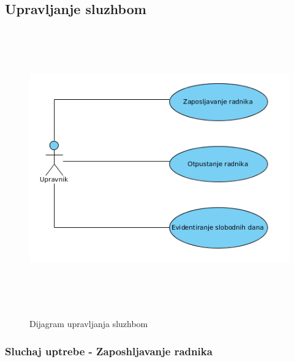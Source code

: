 \documentclass[10 pt]{article}
\begin{document}
	
	\subsection{Upravljanje sluzhbom}
	
	\begin{figure}[H]
		\centering
		\includegraphics[width=12cm,height=12cm,keepaspectratio]{slike/UCUpravljanjeSluzbom.png}\\
		\caption{Dijagram upravljanja sluzhbom}
	\end{figure}
	
	\subsubsection{Sluchaj uptrebe - Zaposhljavanje radnika}
		
\end{document}
